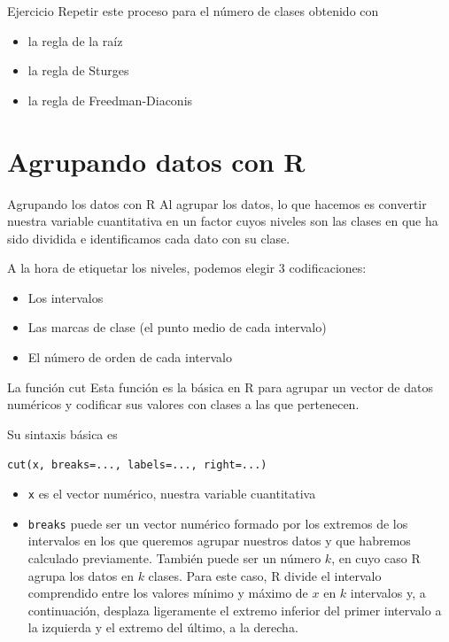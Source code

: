 \documentclass[
  ignorenonframetext,
  aspectratio=169]{beamer}
\providecommand{\tightlist}{%
  \setlength{\itemsep}{0pt}\setlength{\parskip}{0pt}}
\begin{document}
\begin{frame}{Ejercicio}
\protect\hypertarget{ejercicio}{}
Repetir este proceso para el número de clases obtenido con

\begin{itemize}
\tightlist
\item
  la regla de la raíz
\item
  la regla de Sturges
\item
  la regla de Freedman-Diaconis
\end{itemize}
\end{frame}

\hypertarget{agrupando-datos-con-r}{%
\section{Agrupando datos con R}\label{agrupando-datos-con-r}}

\begin{frame}{Agrupando los datos con R}
\protect\hypertarget{agrupando-los-datos-con-r}{}
Al agrupar los datos, lo que hacemos es convertir nuestra variable
cuantitativa en un factor cuyos niveles son las clases en que ha sido
dividida e identificamos cada dato con su clase.

A la hora de etiquetar los niveles, podemos elegir 3 codificaciones:

\begin{itemize}
\tightlist
\item
  Los intervalos
\item
  Las marcas de clase (el punto medio de cada intervalo)
\item
  El número de orden de cada intervalo
\end{itemize}
\end{frame}

\begin{frame}[fragile]{La función cut}
\protect\hypertarget{la-funciuxf3n-cut}{}
Esta función es la básica en R para agrupar un vector de datos numéricos
y codificar sus valores con clases a las que pertenecen.

Su sintaxis básica es

\texttt{cut(x,\ breaks=...,\ labels=...,\ right=...)}

\begin{itemize}
\tightlist
\item
  \texttt{x} es el vector numérico, nuestra variable cuantitativa
\item
  \texttt{breaks} puede ser un vector numérico formado por los extremos
  de los intervalos en los que queremos agrupar nuestros datos y que
  habremos calculado previamente. También puede ser un número \(k\), en
  cuyo caso R agrupa los datos en \(k\) clases. Para este caso, R divide
  el intervalo comprendido entre los valores mínimo y máximo de \(x\) en
  \(k\) intervalos y, a continuación, desplaza ligeramente el extremo
  inferior del primer intervalo a la izquierda y el extremo del último,
  a la derecha.
\end{itemize}
\end{frame}
\end{document}
